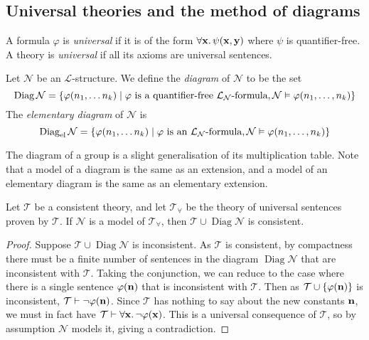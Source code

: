 \subsection{Universal theories and the method of diagrams}
\begin{definition}
    A formula \( \varphi \) is \emph{universal} if it is of the form \( \forall \vb x.\, \psi(\vb x, \vb y) \) where \( \psi \) is quantifier-free.
    A theory is \emph{universal} if all its axioms are universal sentences.
\end{definition}
\begin{definition}
    Let \( \mathcal N \) be an \( \mathcal L \)-structure.
    We define the \emph{diagram} of \( \mathcal N \) to be the set
    \[ \operatorname{Diag} \mathcal N = \qty{\varphi(n_1, \dots n_k) \mid \varphi \text{ is a quantifier-free } \mathcal L_{\mathcal N} \text{-formula}, \mathcal N \vDash \varphi(n_1, \dots, n_k)} \]
    The \emph{elementary diagram} of \( \mathcal N \) is
    \[ \operatorname{Diag}_{\text{el}} \mathcal N = \qty{\varphi(n_1, \dots n_k) \mid \varphi \text{ is an } \mathcal L_{\mathcal N} \text{-formula}, \mathcal N \vDash \varphi(n_1, \dots, n_k)} \]
\end{definition}
The diagram of a group is a slight generalisation of its multiplication table.
Note that a model of a diagram is the same as an extension, and a model of an elementary diagram is the same as an elementary extension.
\begin{lemma}
    Let \( \mathcal T \) be a consistent theory, and let \( \mathcal T_\forall \) be the theory of universal sentences proven by \( \mathcal T \).
    If \( \mathcal N \) is a model of \( \mathcal T_\forall \), then \( \mathcal T \cup \operatorname{Diag} {\mathcal N} \) is consistent.
\end{lemma}
\begin{proof}
    Suppose \( \mathcal T \cup \operatorname{Diag} {\mathcal N} \) is inconsistent.
    As \( \mathcal T \) is consistent, by compactness there must be a finite number of sentences in the diagram \( \operatorname{Diag} {\mathcal N} \) that are inconsistent with \( \mathcal T \).
    Taking the conjunction, we can reduce to the case where there is a single sentence \( \varphi(\vb n) \) that is inconsistent with \( \mathcal T \).
    Then as \( \mathcal T \cup \qty{\varphi(\vb n)} \) is inconsistent, \( \mathcal T \vdash \neg\varphi(\vb n) \).
    Since \( \mathcal T \) has nothing to say about the new constants \( \vb n \), we must in fact have \( \mathcal T \vdash \forall \vb x.\, \neg \varphi(\vb x) \).
    This is a universal consequence of \( \mathcal T \), so by assumption \( \mathcal N \) models it, giving a contradiction.
\end{proof}
